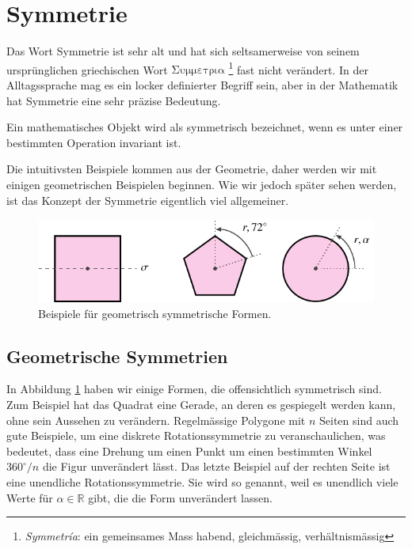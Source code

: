 \section{Symmetrie}
Das Wort Symmetrie ist sehr alt und hat sich seltsamerweise von seinem
ursprünglichen griechischen Wort
\(\mathrm{\Sigma\upsilon\mu\mu\varepsilon\tau\rho\iota\alpha}\)
\footnote{\emph{Symmetr\'ia}: ein gemeinsames Mass habend, gleichmässig,
verhältnismässig} fast nicht verändert. In der Alltagssprache mag es ein
locker definierter Begriff sein, aber in der Mathematik hat Symmetrie eine sehr
präzise Bedeutung.
\begin{definition}[Symmetrie]
	Ein mathematisches Objekt wird als symmetrisch bezeichnet, wenn es unter einer
	bestimmten Operation invariant ist.
\end{definition}
Die intuitivsten Beispiele kommen aus der Geometrie, daher werden wir mit
einigen geometrischen Beispielen beginnen. Wie wir jedoch später sehen werden,
ist das Konzept der Symmetrie eigentlich viel allgemeiner.  

\begin{figure}
	\centering
	\includegraphics{papers/punktgruppen/figures/symmetric-shapes}
	\caption{
		Beispiele für geometrisch symmetrische Formen.
		\label{fig:punktgruppen:geometry-example}
	}
\end{figure}

\subsection{Geometrische Symmetrien}

In Abbildung \ref{fig:punktgruppen:geometry-example} haben wir einige Formen,
die offensichtlich symmetrisch sind.  Zum Beispiel hat das Quadrat eine Gerade, an
deren es gespiegelt werden kann, ohne sein Aussehen zu verändern.  Regelmässige
Polygone mit \(n\) Seiten sind auch gute Beispiele, um eine diskrete
Rotationssymmetrie zu veranschaulichen, was bedeutet, dass eine Drehung um
einen Punkt um einen bestimmten Winkel \(360^\circ/n\) die Figur unverändert
lässt.  Das letzte Beispiel auf der rechten Seite ist eine unendliche
Rotationssymmetrie. Sie wird so genannt, weil es unendlich viele Werte für
\(\alpha \in \mathbb{R}\) gibt, die die Form unverändert lassen.


